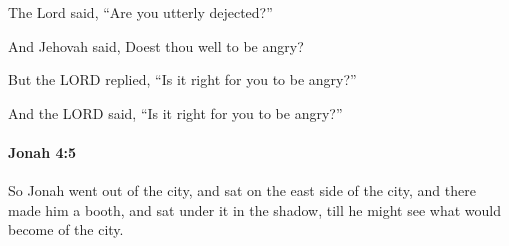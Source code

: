 			\begin{versebox}
					\item[BHS] 
					\item[LXX] 
					\item[AB 1990 270] The Lord said, ``Are you utterly dejected?''
					\item[ASV] And Jehovah said, Doest thou well to be angry?
					\item[NIV] But the LORD replied, “Is it right for you to be angry?”
					\item[NRSV] And the LORD said, “Is it right for you to be angry?”
			\end{versebox}

		\paragraph{Jonah 4:5} %
			\label{JONAH-4-5}

			So Jonah went out of the city, and sat on the east side of the city, and there made him a booth, and sat under it in the shadow, till he might see what would become of the city.

